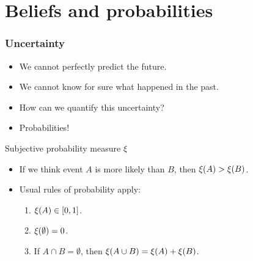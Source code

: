 \section{Beliefs and probabilities}

\begin{frame}
  \frametitle{Uncertainty}
  \begin{itemize}
  \item<1-> We cannot perfectly predict the future.
  \item<2-> We cannot know for sure what happened in the past.
  \item<3-> How can we quantify this uncertainty?
  \item<4-> Probabilities!
  \end{itemize}
  \begin{block}{Subjective probability measure $\xi$}
    \begin{itemize}
    \item If we think event $A$ is more likely than $B$, then $\xi(A) > \xi(B)$.
    \item Usual rules of probability apply:
      \begin{enumerate}
      \item<6-> $\xi(A) \in [0,1]$.
      \item<7-> $\xi(\emptyset) = 0$.
      \item<8-> If $A \cap B = \emptyset$, then $\xi(A \cup B) = \xi(A) + \xi(B)$.
      \end{enumerate}
    \end{itemize}
  \end{block}
\end{frame}

